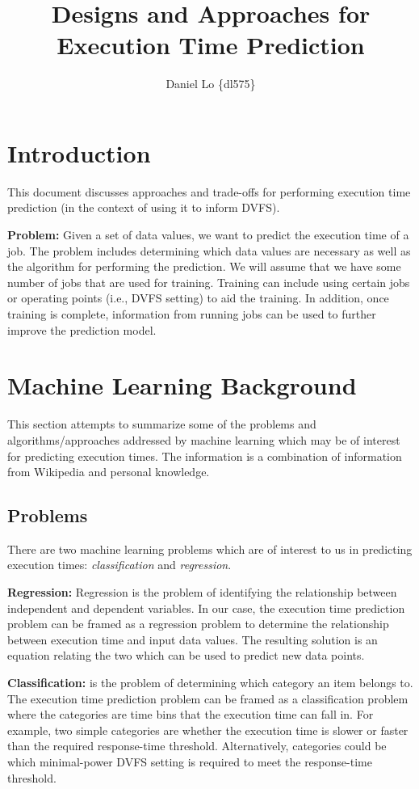 \documentclass[11pt, letterpaper]{article}
\title{Designs and Approaches for Execution Time Prediction}
\author{Daniel Lo \{dl575\}}
\begin{document}

\section{Introduction}

This document discusses approaches and trade-offs for performing execution time
prediction (in the context of using it to inform DVFS).

\textbf{Problem: } Given a set of data values, we want to predict the execution
time of a job. The problem includes determining which data values are necessary
as well as the algorithm for performing the prediction. We will assume that we
have some number of jobs that are used for training. Training can include using
certain jobs or operating points (i.e., DVFS setting) to aid the training. In
addition, once training is complete, information from running jobs can be used
to further improve the prediction model.

\section{Machine Learning Background}
\label{sec:ml}

This section attempts to summarize some of the problems and
algorithms/approaches addressed by machine learning which may be of interest
for predicting execution times. The information is a combination of information
from Wikipedia and personal knowledge.

\subsection{Problems}
\label{sec:ml.problems}

There are two machine learning problems which are of interest to us in
predicting execution times: \emph{classification} and \emph{regression}.

\noindent\textbf{Regression: } Regression is the problem of identifying the relationship between independent
and dependent variables. In our case, the execution time prediction problem can
be framed as a regression problem to determine the relationship between
execution time and input data values. The resulting solution is an equation
relating the two which can be used to predict new data points.

\noindent\textbf{Classification: } is the problem of determining which category an item belongs to.
The execution time prediction problem can be framed as a classification problem
where the categories are time bins that the execution time can fall in. For
example, two simple categories are whether the execution time is slower or
faster than the required response-time threshold. Alternatively, categories
could be which minimal-power DVFS setting is required to meet the response-time
threshold.
\end{document}
